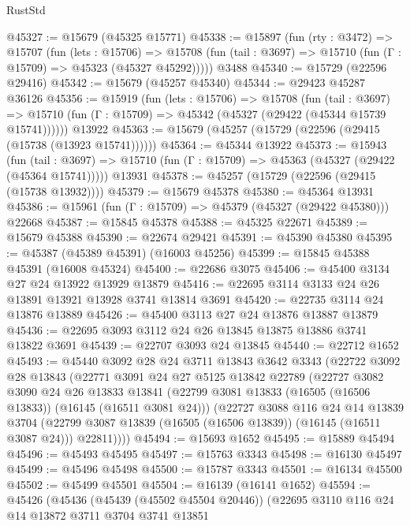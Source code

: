 \begin{lexlean}{RustStd}
\begin{coremodule}
@45327 := @15679 (@45325 @15771)
@45338 := @15897
    (fun (rty : @3472) =>
    @15707
      (fun (lets : @15706) =>
      @15708 (fun (tail : @3697) => @15710 (fun (Γ : @15709) => @45323 (@45327 @45292)))))
    @3488
@45340 := @15729 (@22596 @29416)
@45342 := @15679 (@45257 @45340)
@45344 := @29423 @45287 @36126
@45356 := @15919
    (fun (lets : @15706) =>
    @15708
      (fun (tail : @3697) =>
      @15710 (fun (Γ : @15709) => @45342 (@45327 (@29422 (@45344 @15739 @15741))))))
    @13922
@45363 := @15679 (@45257 (@15729 (@22596 (@29415 (@15738 (@13923 @15741))))))
@45364 := @45344 @13922
@45373 := @15943
    (fun (tail : @3697) => @15710 (fun (Γ : @15709) => @45363 (@45327 (@29422 (@45364 @15741)))))
    @13931
@45378 := @45257 (@15729 (@22596 (@29415 (@15738 @13932))))
@45379 := @15679 @45378
@45380 := @45364 @13931
@45386 := @15961 (fun (Γ : @15709) => @45379 (@45327 (@29422 @45380))) @22668
@45387 := @15845 @45378
@45388 := @45325 @22671
@45389 := @15679 @45388
@45390 := @22674 @29421
@45391 := @45390 @45380
@45395 := @45387 (@45389 @45391) (@16003 @45256)
@45399 := @15845 @45388 @45391 (@16008 @45324)
@45400 := @22686 @3075
@45406 := @45400 @3134 @27 @24 @13922 @13929 @13879
@45416 := @22695 @3114 @3133 @24 @26 @13891 @13921 @13928 @3741 @13814 @3691
@45420 := @22735 @3114 @24 @13876 @13889
@45426 := @45400 @3113 @27 @24 @13876 @13887 @13879
@45436 := @22695 @3093 @3112 @24 @26 @13845 @13875 @13886 @3741 @13822 @3691
@45439 := @22707 @3093 @24 @13845
@45440 := @22712 @1652
@45493 := @45440
    @3092
    @28
    @24
    @3711
    @13843
    @3642
    @3343
    (@22722
      @3092
      @28
      @13843
      (@22771
        @3091
        @24
        @27
        @5125
        @13842
        @22789
        (@22727
          @3082
          @3090
          @24
          @26
          @13833
          @13841
          (@22799 @3081 @13833 (@16505 (@16506 @13833)) (@16145 (@16511 @3081 @24)))
          (@22727
            @3088
            @116
            @24
            @14
            @13839
            @3704
            (@22799 @3087 @13839 (@16505 (@16506 @13839)) (@16145 (@16511 @3087 @24)))
            @22811))))
@45494 := @15693 @1652
@45495 := @15889 @45494
@45496 := @45493 @45495
@45497 := @15763 @3343
@45498 := @16130 @45497
@45499 := @45496 @45498
@45500 := @15787 @3343
@45501 := @16134 @45500
@45502 := @45499 @45501
@45504 := @16139 (@16141 @1652)
@45594 := @45426
    (@45436
      (@45439 (@45502 @45504 @20446))
      (@22695
        @3110
        @116
        @24
        @14
        @13872
        @3711
        @3704
        @3741
        @13851

\end{coremodule}
\end{lexlean}
